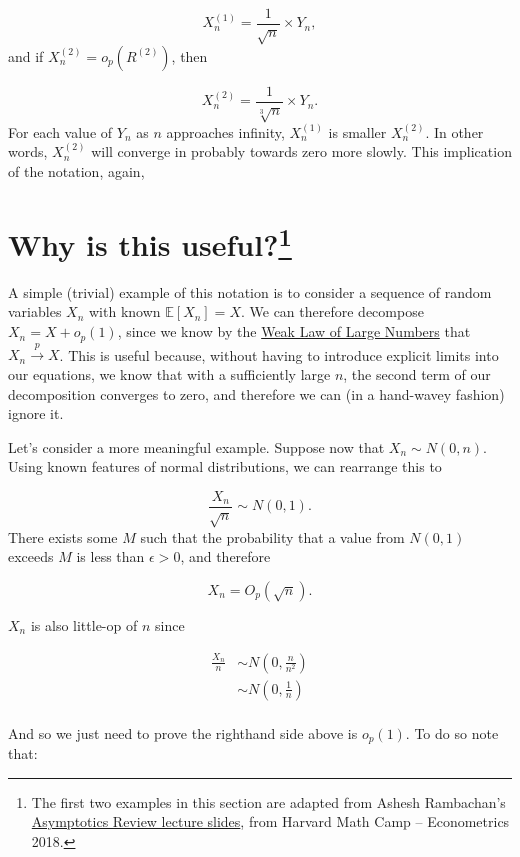 \documentclass[
]{book}
\begin{document}
\[
X_n^{(1)} = \frac{1}{\sqrt{n}}\times Y_n,
\]
and if \(X_n^{(2)} = o_p(R^{(2)})\), then

\[
X_n^{(2)} = \frac{1}{\sqrt[3]{n}} \times Y_n.
\]
For each value of \(Y_n\) as \(n\) approaches infinity, \(X_n^{(1)}\) is smaller \(X_n^{(2)}\). In other words, \(X_n^{(2)}\) will converge in probably towards zero more slowly. This implication of the notation, again,

\hypertarget{why-is-this-usefulfn_cite1}{%
\section[Why is this useful?]{\texorpdfstring{Why is this useful?\footnote{The first two examples in this section are adapted from Ashesh Rambachan's \href{https://scholar.harvard.edu/files/asheshr/files/asymptotics-slides.pdf}{Asymptotics Review lecture slides}, from Harvard Math Camp -- Econometrics 2018.}}{Why is this useful?}}\label{why-is-this-usefulfn_cite1}}

A simple (trivial) example of this notation is to consider a sequence of random variables \(X_n\) with known \(\mathbb{E}[X_n] = X\). We can therefore decompose \(X_n = X + o_p(1)\), since we know by the \protect\hyperlink{wlln}{Weak Law of Large Numbers} that \(X_n \xrightarrow{p} X\). This is useful because, without having to introduce explicit limits into our equations, we know that with a sufficiently large \(n\), the second term of our decomposition converges to zero, and therefore we can (in a hand-wavey fashion) ignore it.

Let's consider a more meaningful example. Suppose now that \(X_n \sim N(0,n)\). Using known features of normal distributions, we can rearrange this to

\[ \frac{X_n}{\sqrt{n}} \sim N(0,1). \]
There exists some \(M\) such that the probability that a value from \(N(0,1)\) exceeds \(M\) is less than \(\epsilon > 0\), and therefore

\[ X_n = O_p(\sqrt{n}).\]

\(X_n\) is also little-op of \(n\) since

\[\begin{aligned}
\frac{X_n}{n} &\sim N(0,\frac{n}{n^2})\\
&\sim N(0,\frac{1}{n})\\
\end{aligned}\]

And so we just need to prove the righthand side above is \(o_p(1)\). To do so note that:
\end{document}
